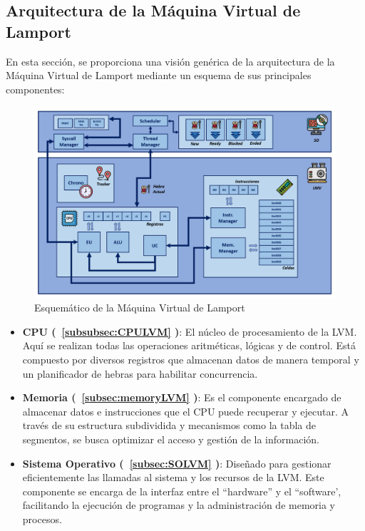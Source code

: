 \subsection{Arquitectura de la Máquina Virtual de Lamport}\label{subsec:archLVM}
En esta sección, se proporciona una visión genérica de la arquitectura de la Máquina Virtual de Lamport mediante un esquema de sus principales componentes:

\begin{figure}[h]
    \includegraphics[width=\linewidth]{images/lmp/LVM_resume.png}
    \caption{Esquemático de la Máquina Virtual de Lamport}
    \label{fig:LVMResume}
\end{figure}

\begin{itemize}
    \item \textbf{CPU (~\ref{subsubsec:CPULVM} )}: El núcleo de procesamiento de la LVM. Aquí se realizan todas las operaciones aritméticas, lógicas y de control. Está compuesto por diversos registros que almacenan datos de manera temporal y un planificador de hebras para habilitar concurrencia.
    
    \item \textbf{Memoria (~\ref{subsec:memoryLVM} )}: Es el componente encargado de almacenar datos e instrucciones que el CPU puede recuperar y ejecutar. A través de su estructura subdividida y mecanismos como la tabla de segmentos, se busca optimizar el acceso y gestión de la información.

    \item \textbf{Sistema Operativo (~\ref{subsec:SOLVM} )}: Diseñado para gestionar eficientemente las llamadas al sistema y los recursos de la LVM. Este componente se encarga de la interfaz entre el ``hardware'' y el ``software', facilitando la ejecución de programas y la administración de memoria y procesos.
\end{itemize}

